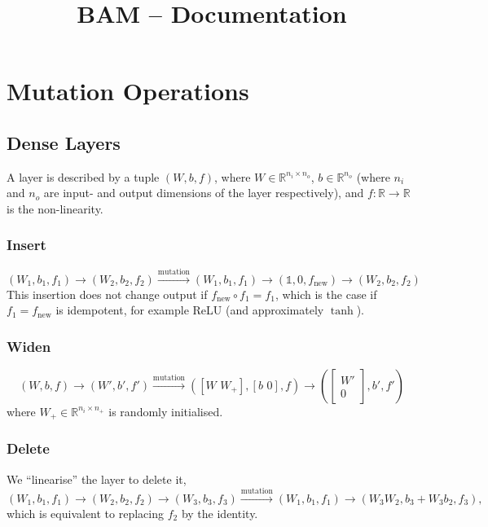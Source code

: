 \documentclass{article}
\theoremstyle{nonumberplain}
\theoremstyle{nonumberplain}
\theoremstyle{empty}
\numberwithin{equation}{section}
\newcommand{\R}{\mathbb{R}} %
\newcommand{\tendsto}[1]{\stackrel{#1}{\longrightarrow}}
\newcommand{\ind}{\mathds{1}}
\begin{document}
\title{BAM -- Documentation}
\maketitle
\vspace{20pt}

\section{Mutation Operations}
\subsection{Dense Layers}
A layer is described by a tuple $(W,b,f)$, where $W \in \R ^{n_i \times n_o}$, $b\in \R ^{n_o}$ (where $n_i$ and $n_o$ are input- and output dimensions of the layer respectively), and $f\colon \R\to \R$ is the non-linearity.
\subsubsection*{Insert}
\begin{equation*}
     (W_1,b_1,f_1) \rightarrow (W_2,b_2,f_2) \tendsto{\text{mutation}} (W_1,b_1,f_1) \rightarrow ( \ind,0,f_\text{new}) \rightarrow (W_2,b_2,f_2)
\end{equation*}
This insertion does not change output if $f_\text{new}\circ f_1 = f_1$, which is the case if $f_1 = f_\text{new}$ is idempotent, for example ReLU (and approximately $\tanh$).

\subsubsection*{Widen}
\begin{equation*}
    (W,b,f) \rightarrow (W',b',f') \tendsto{\text{mutation}} ([W \,\, W_+] , [ b \,\, 0] , f) \rightarrow (\begin{bmatrix} W' \\ 0 \end{bmatrix} , b',f')
\end{equation*}
where $W_+ \in \R ^{n_i \times n_+}$ is randomly initialised.

\subsubsection*{Delete}
We ``linearise'' the layer to delete it,
\begin{equation*}
    (W_1,b_1,f_1) \rightarrow (W_2,b_2,f_2) \rightarrow (W_3,b_3,f_3) \tendsto{\text{mutation}} (W_1,b_1,f_1) \rightarrow (W_3 W_2, b_3 + W_3 b_2, f_3),
\end{equation*}
which is equivalent to replacing $f_2$ by the identity.
\end{document}
